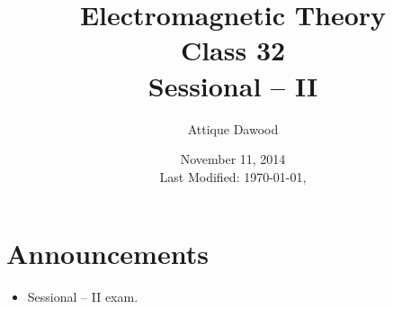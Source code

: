 \documentclass[12pt,a4paper]{article}
\title{Electromagnetic Theory\\Class 32\\Sessional -- II}
\author{Attique Dawood}
\date{November 11, 2014\\[0.2cm] Last Modified: \today, \currenttime}
\begin{document}
\maketitle
\section{Announcements}
\begin{itemize}
\item Sessional -- II exam.
\end{itemize}
\end{document}
